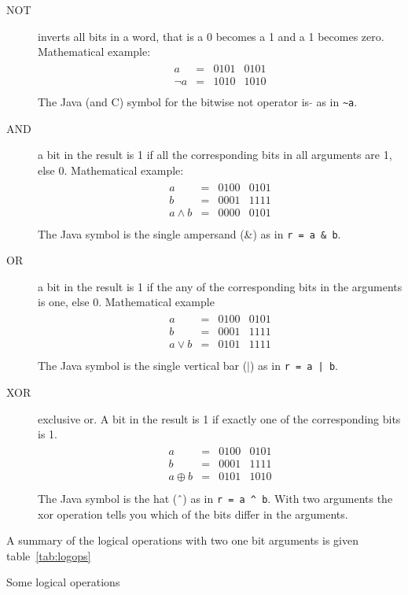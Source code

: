 \begin{description}
\item[NOT] inverts all bits in a word, that is a 0
  becomes a 1 and a 1 becomes zero. Mathematical example:
  \texttt{
    \begin{eqnarray*}
      \begin{aligned}
        a      &=& 0101 & 0101\\\hline
        \lnot a &=& 1010 & 1010\\
      \end{aligned}
    \end{eqnarray*}}
  The Java (and C) symbol for the bitwise not operator is $\tilde{ }$ as
  in \lstinline{~a}.
\item[AND] a bit in the result is 1 if all the corresponding bits in
  all arguments are 1, else 0. Mathematical example:
  \texttt{
    \begin{eqnarray*}
      \begin{aligned}
        a         &=& 0100& 0101\\
        b         &=& 0001& 1111\\\hline
        a \land b &=& 0000& 0101\\
      \end{aligned}
    \end{eqnarray*}}
  The Java symbol is the single ampersand (\&) as in \lstinline{r = a & b}.
\item[OR] a bit in the result is 1 if the any of the corresponding bits in the
  arguments is one, else 0. Mathematical example
  \texttt{
    \begin{eqnarray*}
      \begin{aligned}
        a        &=& 0100& 0101\\
        b        &=& 0001& 1111\\\hline
        a \lor b &=& 0101& 1111\\
      \end{aligned}
    \end{eqnarray*}}
  The Java symbol is the single vertical bar ($|$)  as in \lstinline{r = a | b}.
  
\item[XOR] exclusive or. A bit in the result is 1 if exactly one of
  the corresponding bits is 1.
  \texttt{
    \begin{eqnarray*}
      \begin{aligned}
        a          &=& 0100& 0101\\
        b          &=& 0001& 1111\\\hline
        a \oplus b &=& 0101& 1010\\
      \end{aligned}
    \end{eqnarray*}}
  The Java symbol is the hat (\^\ )  as in \lstinline{r = a ^ b}. With two
  arguments the xor operation tells you which of the bits differ in the
  arguments.  
\end{description}

A summary of the logical operations with two one bit arguments is given
table~\ref{tab:logops}

\begin{table}[htbp]
  \caption{\label{tab:logops}Some logical operations}
  
\end{table}

